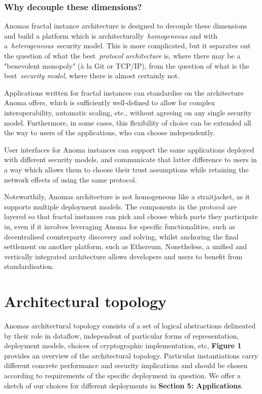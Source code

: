 \subsubsection{Why decouple these
dimensions?}\label{why-decouple-these-dimensions}

Anoma\textquotesingle s fractal instance architecture is designed to
decouple these dimensions and build a platform which is
architecturally~\emph{homogeneous} and with
a~\emph{heterogeneous}~security model. This is more complicated, but it
separates out the question of what the best~\emph{protocol architecture}
is, where there may be a "benevolent monopoly" (à la Git or TCP/IP),
from the question of what is the best~\emph{security model}, where there
is almost certainly not.

Applications written for fractal instances can standardise on the
architecture Anoma offers, which is sufficiently well-defined to allow
for complex interoperability, automatic scaling, etc., without agreeing
on any single security model. Furthermore, in some cases, this
flexibility of choice can be extended all the way to users of the
applications, who can choose independently.

User interfaces for Anoma instances can support the same applications
deployed with different security models, and communicate that latter
difference to users in a way which allows them to choose their trust
assumptions while retaining the network effects of using the same
protocol.

Noteworthily, Anoma\textquotesingle s architecture is not homogeneous
like a straitjacket, as it supports multiple deployment models. The
components in the protocol are layered so that fractal instances can
pick and choose which parts they participate in, even if it involves
leveraging Anoma for specific functionalities, such as decentralised
counterparty discovery and solving, whilst anchoring the final
settlement on another platform, such as Ethereum. Nonetheless, a unified
and vertically integrated architecture allows developers and users to
benefit from standardisation.

\section{Architectural topology}\label{architectural-topology}

Anoma\textquotesingle s architectural topology consists of a set of
logical abstractions delineated by their role in dataflow, independent
of particular forms of representation, deployment models, choices of
cryptographic implementation, etc, \textbf{Figure 1} provides an
overview of the architectural topology. Particular instantiations carry
different concrete performance and security implications and should be
chosen according to requirements of the specific deployment in question.
We offer a sketch of our choices for different deployments in
\textbf{Section 5: Applications}.

